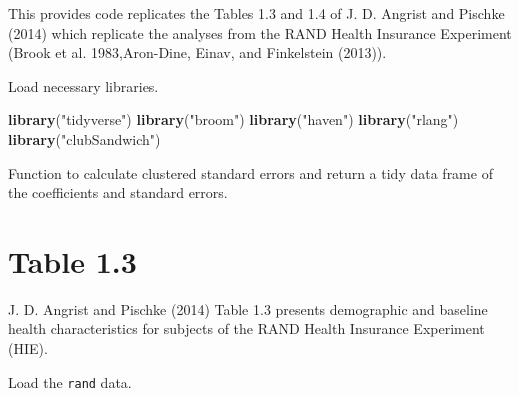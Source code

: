 \documentclass[]{book}
\newenvironment{Shaded}{\begin{snugshade}}{\end{snugshade}}
\newcommand{\KeywordTok}[1]{\textcolor[rgb]{0.13,0.29,0.53}{\textbf{#1}}}
\newcommand{\DataTypeTok}[1]{\textcolor[rgb]{0.13,0.29,0.53}{#1}}
\newcommand{\StringTok}[1]{\textcolor[rgb]{0.31,0.60,0.02}{#1}}
\newcommand{\ControlFlowTok}[1]{\textcolor[rgb]{0.13,0.29,0.53}{\textbf{#1}}}
\newcommand{\OperatorTok}[1]{\textcolor[rgb]{0.81,0.36,0.00}{\textbf{#1}}}
\newcommand{\NormalTok}[1]{#1}
\theoremstyle{definition}
\theoremstyle{definition}
\theoremstyle{definition}
\theoremstyle{remark}
\begin{document}
This provides code replicates the Tables 1.3 and 1.4 of J. D. Angrist
and Pischke (2014) which replicate the analyses from the RAND Health
Insurance Experiment (Brook et al. 1983,Aron-Dine, Einav, and
Finkelstein (2013)).

Load necessary libraries.

\begin{Shaded}
\begin{Highlighting}[]
\KeywordTok{library}\NormalTok{(}\StringTok{"tidyverse"}\NormalTok{)}
\KeywordTok{library}\NormalTok{(}\StringTok{"broom"}\NormalTok{)}
\KeywordTok{library}\NormalTok{(}\StringTok{"haven"}\NormalTok{)}
\KeywordTok{library}\NormalTok{(}\StringTok{"rlang"}\NormalTok{)}
\KeywordTok{library}\NormalTok{(}\StringTok{"clubSandwich"}\NormalTok{)}
\end{Highlighting}
\end{Shaded}

Function to calculate clustered standard errors and return a tidy data
frame of the coefficients and standard errors.

\begin{Shaded}
\end{Shaded}

\section{Table 1.3}\label{table-1.3}

J. D. Angrist and Pischke (2014) Table 1.3 presents demographic and
baseline health characteristics for subjects of the RAND Health
Insurance Experiment (HIE).

Load the \texttt{rand} data.
\end{document}
